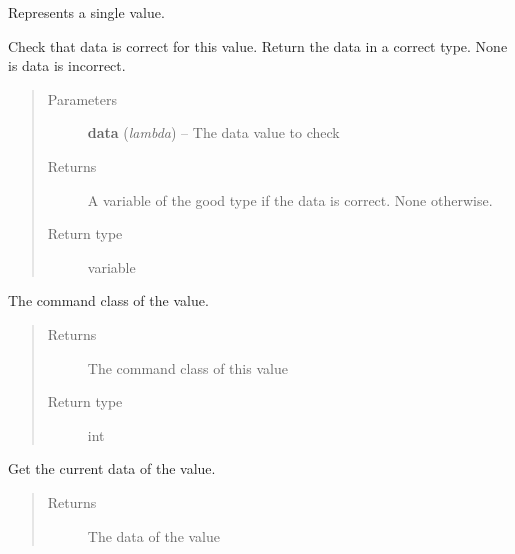 \documentclass[letterpaper,10pt,english]{sphinxmanual}
\begin{document}
\begin{fulllineitems}
\label{value:openzwave.value.ZWaveValue}
Represents a single value.

\begin{fulllineitems}
\label{value:openzwave.value.ZWaveValue.check_data}
Check that data is correct for this value.
Return the data in a correct type. None is data is incorrect.
\begin{quote}\begin{description}
\item[{Parameters}] \leavevmode
\textbf{data} (\emph{lambda}) -- The data value to check

\item[{Returns}] \leavevmode
A variable of the good type if the data is correct. None otherwise.

\item[{Return type}] \leavevmode
variable

\end{description}\end{quote}

\end{fulllineitems}


\begin{fulllineitems}
\label{value:openzwave.value.ZWaveValue.command_class}
The command class of the value.
\begin{quote}\begin{description}
\item[{Returns}] \leavevmode
The command class of this value

\item[{Return type}] \leavevmode
int

\end{description}\end{quote}

\end{fulllineitems}


\begin{fulllineitems}
\label{value:openzwave.value.ZWaveValue.data}
Get the current data of the value.
\begin{quote}\begin{description}
\item[{Returns}] \leavevmode
The data of the value


\end{description}
\end{quote}
\end{fulllineitems}
\end{fulllineitems}
\end{document}
